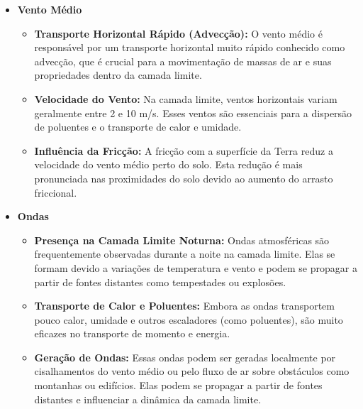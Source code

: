 \begin{itemize}
    \item \textbf{Vento Médio}
    \begin{itemize}
        \item \textbf{Transporte Horizontal Rápido (Advecção):} O vento médio é responsável por um transporte horizontal muito rápido conhecido como advecção, que é crucial para a movimentação de massas de ar e suas propriedades dentro da camada limite.
        \item \textbf{Velocidade do Vento:} Na camada limite, ventos horizontais variam geralmente entre 2 e 10 m/s. Esses ventos são essenciais para a dispersão de poluentes e o transporte de calor e umidade.
        \item \textbf{Influência da Fricção:} A fricção com a superfície da Terra reduz a velocidade do vento médio perto do solo. Esta redução é mais pronunciada nas proximidades do solo devido ao aumento do arrasto friccional.
    \end{itemize}
    
    \item \textbf{Ondas}
    \begin{itemize}
        \item \textbf{Presença na Camada Limite Noturna:} Ondas atmosféricas são frequentemente observadas durante a noite na camada limite. Elas se formam devido a variações de temperatura e vento e podem se propagar a partir de fontes distantes como tempestades ou explosões.
        \item \textbf{Transporte de Calor e Poluentes:} Embora as ondas transportem pouco calor, umidade e outros escaladores (como poluentes), são muito eficazes no transporte de momento e energia.
        \item \textbf{Geração de Ondas:} Essas ondas podem ser geradas localmente por cisalhamentos do vento médio ou pelo fluxo de ar sobre obstáculos como montanhas ou edifícios. Elas podem se propagar a partir de fontes distantes e influenciar a dinâmica da camada limite.
    \end{itemize}
    

\end{itemize}
